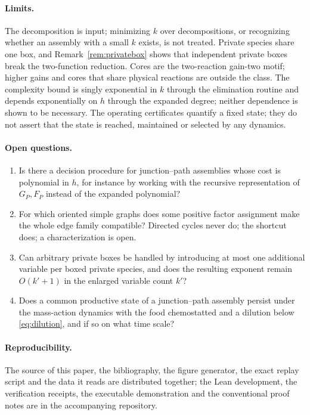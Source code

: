 \documentclass[11pt,a4paper]{article}
\theoremstyle{plain}
\theoremstyle{definition}
\theoremstyle{remark}
\begin{document}
\paragraph{Limits.} The decomposition is input; minimizing $k$ over decompositions, or recognizing whether an assembly with a small $k$ exists, is not treated. Private species share one box, and Remark~\ref{rem:privatebox} shows that independent private boxes break the two-function reduction. Cores are the two-reaction gain-two motif; higher gains and cores that share physical reactions are outside the class. The complexity bound is singly exponential in $k$ through the elimination routine and depends exponentially on $h$ through the expanded degree; neither dependence is shown to be necessary. The operating certificates quantify a fixed state; they do not assert that the state is reached, maintained or selected by any dynamics.

\paragraph{Open questions.}
\begin{enumerate}[label=(\arabic*)]
\item Is there a decision procedure for junction--path assemblies whose cost is polynomial in $h$, for instance by working with the recursive representation of $G_P,F_P$ instead of the expanded polynomial?
\item For which oriented simple graphs does some positive factor assignment make the whole edge family compatible? Directed cycles never do; the shortcut does; a characterization is open.
\item Can arbitrary private boxes be handled by introducing at most one additional variable per boxed private species, and does the resulting exponent remain $O(k'+1)$ in the enlarged variable count $k'$?
\item Does a common productive state of a junction--path assembly persist under the mass-action dynamics with the food chemostatted and a dilution below \eqref{eq:dilution}, and if so on what time scale?
\end{enumerate}

\paragraph{Reproducibility.} The source of this paper, the bibliography, the figure generator, the exact replay script and the data it reads are distributed together; the Lean development, the verification receipts, the executable demonstration and the conventional proof notes are in the accompanying repository.



\end{document}
